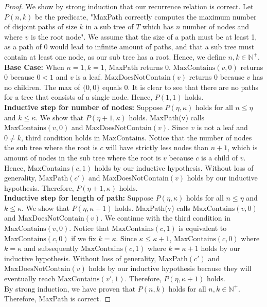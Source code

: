 \documentclass[11pt]{scrartcl}
\newcommand{\maxp}{\text{MaxPath}}
\newcommand{\ctn}{\text{MaxContains}}
\newcommand{\dctn}{\text{MaxDoesNotContain}}
\begin{document}
\begin{proof}
	We show by strong induction that our recurrence relation is correct. Let $P(n,k)$ be the predicate,
	"MaxPath correctly computes the maximum number of disjoint paths of size $k$ in a sub tree
	of $T$ which has $n$ number of nodes and where $v$ is the root node".
	We assume that the size of a path must be at least 1, as a path of 0 would lead to infinite amount of
	paths, and that a sub tree must contain at least one node, as our sub tree has a root.
	Hence, we define $n,k \in \mathbb{N}^+$. \\
	\textbf{Base Case:} When $n = 1, k = 1$, MaxPath returns 0. $\ctn(v,0)$ returns 0 because
	$0 < 1$ and $v$ is a leaf. $\dctn(v)$ returns 0 because $v$ has no children. The max of $\{0,0\}$
	equals $0$. It is clear to see that there are no paths for a tree that consists of a single node.
	Hence, $P(1,1)$ holds.\\
	\textbf{Inductive step for number of nodes:} Suppose $P(\eta,\kappa)$ holds for all $n \leq \eta$ and $k \leq \kappa$.
	We show that $P(\eta + 1,\kappa)$ holds. MaxPath(v) calls $\ctn(v,0)$ and $\dctn(v)$. Since $v$
	is not a leaf and $0 \neq k$, third condition holds in $\ctn$.
	Notice that the number of nodes the sub tree where the root is $c$ will have strictly less nodes than $n + 1$,
	which is amount of nodes in the sub tree where the root is $v$ because $c$ is a child of $v$.
	Hence, $\ctn(c, 1)$ holds by our inductive hypothesis.
	Without loss of generality, $\maxp(c')$ and $\dctn(v)$ holds by our inductive hypothesis.
	Therefore, $P(\eta + 1,\kappa)$ holds.\\
	\textbf{Inductive step for length of path:} Suppose $P(\eta,\kappa)$ holds for all $n \leq \eta$ and
	$k \leq \kappa$. We show that $P(\eta,\kappa + 1)$ holds. MaxPath(v) calls $\ctn(v,0)$ and $\dctn(v)$.
	We continue with the third condition in $\ctn(v,0)$.
	Notice that $\ctn(c, 1)$ is equivalent to $\ctn(c,0)$ if we fix $k = \kappa$.
	Since $\kappa \leq \kappa + 1$, $\ctn(c,0)$ where $k = \kappa$ and subsequently
	$\ctn(c, 1)$ where $k = \kappa + 1$ holds by our inductive hypothesis.
	Without loss of generality, $\maxp(c')$ and $\dctn(v)$ holds by our inductive hypothesis
	because they will eventually reach $\ctn(v', 1)$. Therefore, $P(\eta,\kappa+ 1)$ holds.\\
	By strong induction, we have proven that $P(n,k)$ holds for all $n,k \in \mathbb{N}^+$.
	Therefore, MaxPath is correct.
\end{proof}
\end{document}
